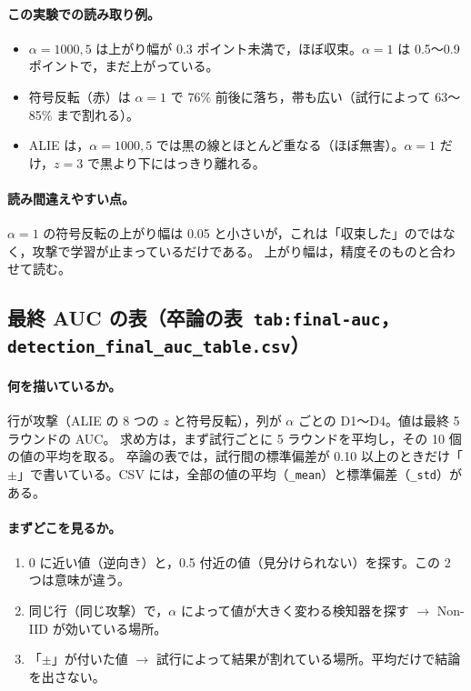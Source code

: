 \documentclass[a4j, dvipdfmx]{jsarticle}  %
\begin{document}
\paragraph{この実験での読み取り例。}
\begin{itemize}
  \item $\alpha = 1000, 5$ は上がり幅が 0.3 ポイント未満で，ほぼ収束。$\alpha = 1$ は 0.5〜0.9 ポイントで，まだ上がっている。
  \item 符号反転（赤）は $\alpha = 1$ で 76\% 前後に落ち，帯も広い（試行によって 63〜85\% まで割れる）。
  \item ALIE は，$\alpha = 1000, 5$ では黒の線とほとんど重なる（ほぼ無害）。$\alpha = 1$ だけ，$z = 3$ で黒より下にはっきり離れる。
\end{itemize}

\paragraph{読み間違えやすい点。}
$\alpha = 1$ の符号反転の上がり幅は 0.05 と小さいが，これは「収束した」のではなく，攻撃で学習が止まっているだけである。
上がり幅は，精度そのものと合わせて読む。

\subsection{最終 AUC の表（卒論の表\ \texttt{tab:final-auc}，\texttt{detection\_final\_auc\_table.csv}）}

\paragraph{何を描いているか。}
行が攻撃（ALIE の 8 つの $z$ と符号反転），列が $\alpha$ ごとの D1〜D4。値は最終 5 ラウンドの AUC。
求め方は，まず試行ごとに 5 ラウンドを平均し，その 10 個の値の平均を取る。
卒論の表では，試行間の標準偏差が 0.10 以上のときだけ「$\pm$」で書いている。CSV には，全部の値の平均（\texttt{\_mean}）と標準偏差（\texttt{\_std}）がある。

\paragraph{まずどこを見るか。}
\begin{enumerate}
  \item 0 に近い値（逆向き）と，0.5 付近の値（見分けられない）を探す。この 2 つは意味が違う。
  \item 同じ行（同じ攻撃）で，$\alpha$ によって値が大きく変わる検知器を探す $\rightarrow$ Non-IID が効いている場所。
  \item 「$\pm$」が付いた値 $\rightarrow$ 試行によって結果が割れている場所。平均だけで結論を出さない。
\end{enumerate}
\end{document}
